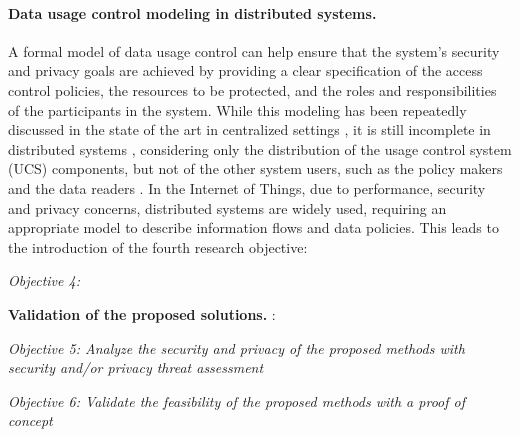 \paragraph{Data usage control modeling in distributed systems.}
A formal model of data usage control can help ensure that the system's security and privacy goals are achieved by providing a clear specification of the access control policies, the resources to be protected, and the roles and responsibilities of the participants in the system. 
While this modeling has been repeatedly discussed in the state of the art in centralized settings \cite{Pretschner2011, Kelbert2013, Kelbert2014, Fromm2020}, it is still incomplete in distributed systems \cite{Gil2023}, considering only the distribution of the usage control system (UCS) components, but not of the other system users, such as the policy makers and the data readers \cite{Kelbert2015, Kelbert2018}.
In the Internet of Things, due to performance, security and privacy concerns, distributed systems are widely used, requiring 
an appropriate model to describe information flows and data policies. This leads to the introduction of the fourth research objective:
\begin{mdframed}[ skipabove=20pt, skipbelow=20pt, innertopmargin=12pt, innerbottommargin=12pt] 
\begin{center}
     \emph{Objective 4: } 
     \label{obj:4}
\end{center}
\end{mdframed}

\textbf{Validation of the proposed solutions.}  :

\begin{mdframed}[ skipabove=20pt, skipbelow=20pt, innertopmargin=12pt, innerbottommargin=12pt] 
\label{obj:5_6}    
    \begin{center}
         \emph{Objective 5: Analyze the security and privacy of the proposed methods with security and/or privacy threat assessment} 
        \newline
    
    
       \emph{Objective 6: Validate the feasibility of the proposed methods with 
       a proof of concept}
       \newline 
       
       \label{obj:56}
    \end{center}
    \end{mdframed}

